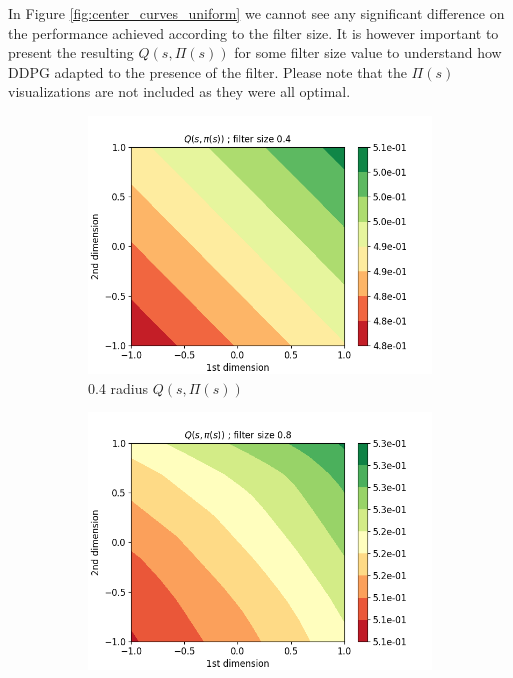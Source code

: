 \documentclass{article}
\begin{document}
In Figure \ref{fig:center_curves_uniform} we cannot see any significant difference on the performance achieved according to the filter size. It is however important to present the resulting $Q(s, \Pi(s))$ for some filter size value to understand how DDPG adapted to the presence of the filter. Please note that the $\Pi(s)$ visualizations are not included as they were all optimal.

\begin{figure}[H]
  \centering
   \begin{subfigure}[b]{0.3\linewidth}
    \includegraphics[width=\linewidth]{Study_2/2.1/visualizations/Q_contour_0_4.png}
      \caption{0.4 radius $Q(s, \Pi(s))$}
  \end{subfigure}
   \begin{subfigure}[b]{0.3\linewidth}
    \includegraphics[width=\linewidth]{Study_2/2.1/visualizations/Q_contour_0_8.png}

\end{subfigure}
\end{figure}
\end{document}
